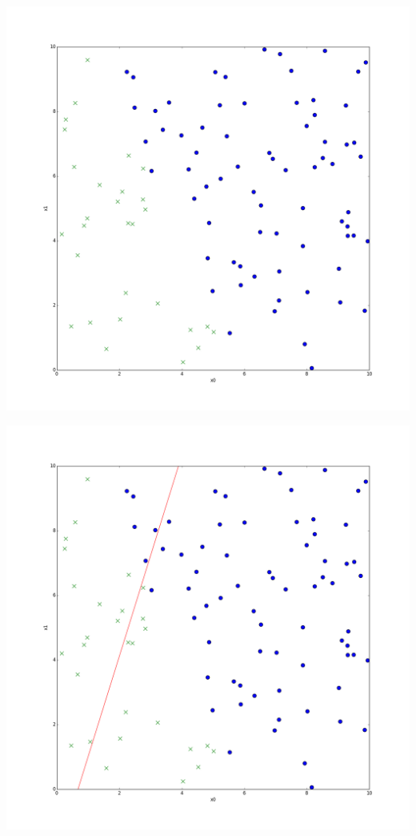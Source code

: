 \begin{frame}
  \begin{center}
    \includegraphics[scale=0.2]{./pictures/logreg_db000.png}
  \end{center}
\end{frame}

\begin{frame}
  \begin{center}
    \includegraphics[scale=0.2]{./pictures/logreg_db001.png}
  \end{center}
\end{frame}

